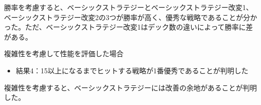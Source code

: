 勝率を考慮すると、ベーシックストラテジーとベーシックストラテジー改変1、ベーシックストラテジー改変2の3つが勝率が高く、優秀な戦略であることが分かった。ただ、ベーシックストラテジー改変1はデック数の違いによって勝率に差がある。

複雑性を考慮して性能を評価した場合
\begin{itemize}
\item 結果4：15以上になるまでヒットする戦略が1番優秀であることが判明した
\end{itemize}

複雑性を考慮すると、ベーシックストラテジーには改善の余地があることが判明した。
